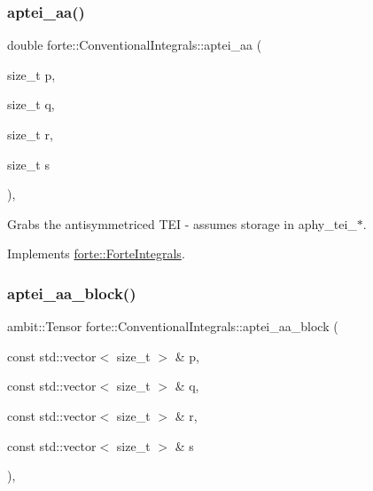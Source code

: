 \subsubsection{\texorpdfstring{aptei\+\_\+aa()}{aptei\_aa()}}
{\footnotesize\ttfamily double forte\+::\+Conventional\+Integrals\+::aptei\+\_\+aa (\begin{DoxyParamCaption}\item[{size\+\_\+t}]{p,  }\item[{size\+\_\+t}]{q,  }\item[{size\+\_\+t}]{r,  }\item[{size\+\_\+t}]{s }\end{DoxyParamCaption})\hspace{0.3cm}{\ttfamily [override]}, {\ttfamily [virtual]}}



Grabs the antisymmetriced T\+EI -\/ assumes storage in aphy\+\_\+tei\+\_\+$\ast$. 



Implements \mbox{\hyperlink{classforte_1_1_forte_integrals_afc84c157025b56ee0f8e3b1abe1c0a5f}{forte\+::\+Forte\+Integrals}}.

\mbox{\label{classforte_1_1_conventional_integrals_abbe1dfb244b776a9d50fb2a06a837cbf}} 
\subsubsection{\texorpdfstring{aptei\+\_\+aa\+\_\+block()}{aptei\_aa\_block()}}
{\footnotesize\ttfamily ambit\+::\+Tensor forte\+::\+Conventional\+Integrals\+::aptei\+\_\+aa\+\_\+block (\begin{DoxyParamCaption}\item[{const std\+::vector$<$ size\+\_\+t $>$ \&}]{p,  }\item[{const std\+::vector$<$ size\+\_\+t $>$ \&}]{q,  }\item[{const std\+::vector$<$ size\+\_\+t $>$ \&}]{r,  }\item[{const std\+::vector$<$ size\+\_\+t $>$ \&}]{s }\end{DoxyParamCaption})\hspace{0.3cm}{\ttfamily [override]}, {\ttfamily [virtual]}}



